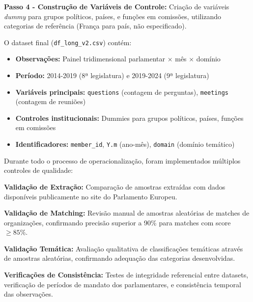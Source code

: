 \textbf{Passo 4 - Construção de Variáveis de Controle:} Criação de variáveis \textit{dummy} para grupos políticos, países, e funções em comissões, utilizando categorias de referência (França para país, não especificado).

O dataset final (\texttt{df\_long\_v2.csv}) contém:
\begin{itemize}
    \item \textbf{Observações:} Painel tridimensional parlamentar × mês × domínio
    \item \textbf{Período:} 2014-2019 (8ª legislatura) e 2019-2024 (9ª legislatura)
    \item \textbf{Variáveis principais:} \texttt{questions} (contagem de perguntas), \texttt{meetings} (contagem de reuniões)
    \item \textbf{Controles institucionais:} Dummies para grupos políticos, países, funções em comissões
    \item \textbf{Identificadores:} \texttt{member\_id}, \texttt{Y.m} (ano-mês), \texttt{domain} (domínio temático)
\end{itemize}


Durante todo o processo de operacionalização, foram implementados múltiplos controles de qualidade:

\textbf{Validação de Extração:} Comparação de amostras extraídas com dados disponíveis publicamente no site do Parlamento Europeu.

\textbf{Validação de Matching:} Revisão manual de amostras aleatórias de matches de organizações, confirmando precisão superior a 90\% para matches com score $\geq 85\%$.

\textbf{Validação Temática:} Avaliação qualitativa de classificações temáticas através de amostras aleatórias, confirmando adequação das categorias desenvolvidas.

\textbf{Verificações de Consistência:} Testes de integridade referencial entre datasets, verificação de períodos de mandato dos parlamentares, e consistência temporal das observações.
